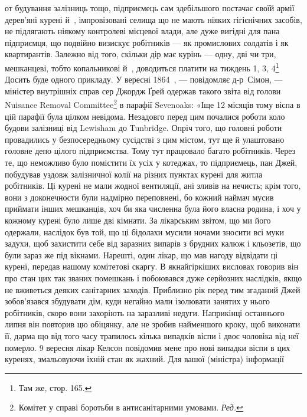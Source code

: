 \parcont{}  %
от будування залізниць тощо, підприємець сам здебільшого постачає
своїй армії дерев’яні курені й~, імпровізовані селища
що не мають ніяких гігієнічних засобів, не підлягають ніякому
контролеві місцевої влади, але дуже вигідні для пана підприємця,
що подвійно визискує робітників — як промислових солдатів
і як квартирантів. Залежно від того, скільки дір має курінь —
одну, дві чи три, мешканцеві, тобто копальникові й~, доводиться
платити на тиждень 1, 3, 4\footnote{
Там же, стор. 165.
} Досить буде одного
прикладу. У вересні 1864~, — повідомляє д-р~Сімон, — міністер
внутрішніх справ сер Джордж Ґрей одержав такого звіта
від голови Nuisance Removal Committee\footnote*{
Комітет у справі боротьби в антисанітарними умовами. \emph{Ред.}
} в парафії Sevenoaks:
«Іще 12 місяців тому віспа в цій парафії була цілком невідома.
Незадовго перед цим почалися роботи коло будови залізниці
від Lewisham до Tunbridge. Опріч того, що головні роботи провадились
у безпосередньому сусідстві з цим містом, тут ще й
улаштовано головне депо цілого підприємства. Тому тут працювало
багато робітників. Через те, що неможливо було помістити
їх усіх у котеджах, то підприємець, пан Джей, побудував уздовж
залізничної колії на різних пунктах курені для житла робітників.
Ці курені не мали жодної вентиляції, ані зливів на нечисть;
крім того, вони з доконечности були надмірно переповнені,
бо кожний наймач мусив приймати інших мешканців, хоч би
яка численна була його власна родина, і хоч у кожному курені
було лише дві кімнати. За лікарським звітом, що ми його одержали,
наслідок був той, що ці бідолахи мусили ночами зносити
всі муки задухи, щоб захистити себе від заразних випарів з брудних
калюж і кльозетів, що були зараз же під вікнами. Нарешті,
один лікар, що мав нагоду відвідати ці курені, передав нашому
комітетові скаргу. В якнайгіркіших висловах говорив він про
стан цих так званих помешкань і побоювався дуже серйозних
наслідків, якщо не вживеться деяких санітарних заходів. Приблизно
рік перед тим згаданий Джей зобов’язався збудувати дім,
куди негайно мали ізолювати занятих у нього робітників, скоро
вони захоріють на заразливі недуги. Наприкінці останнього
липня він повторив цю обіцянку, але не зробив найменшого
кроку, щоб виконати її, дарма що від того часу трапилось кілька
випадків віспи і двоє чоловіка від неї померло. 9 вересня лікар
Келсон повідомив мене про нові випадки віспи в цих куренях,
змальовуючи їхній стан як жахний. Для вашої (міністра) інформації
